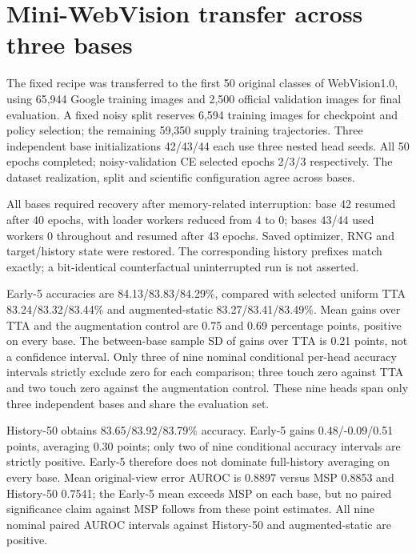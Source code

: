 \section{Mini-WebVision transfer across three bases}
\label{sec:minipilot}
The fixed recipe was transferred to the first 50 original classes of WebVision1.0,
using 65,944 Google training images and 2,500 official validation images for final
evaluation. A fixed noisy split reserves 6,594 training images for checkpoint and
policy selection; the remaining 59,350 supply training trajectories. Three
independent base initializations 42/43/44 each use three nested head seeds.
All 50 epochs completed; noisy-validation CE selected epochs 2/3/3 respectively.
The dataset realization, split and scientific configuration agree across bases.

All bases required recovery after memory-related interruption: base 42 resumed
after 40 epochs, with loader workers reduced from 4 to 0; bases 43/44 used workers 0
throughout and resumed after 43 epochs. Saved optimizer, RNG and target/history
state were restored. The corresponding history prefixes match exactly; a
bit-identical counterfactual uninterrupted run is not asserted.

\begin{table}[t]
\centering

\caption{Mini-WebVision accuracy (\%) across independent bases. Learned methods
average three nested heads per base, then bases equally. They are not ensembles.
Error AUROC is the equally weighted mean for original-view FP32 base errors.
Each method uses its own noisy-validation policy.}
\label{tab:minipilot}
\end{table}

Early-5 accuracies are 84.13/83.83/84.29\%, compared with selected uniform
TTA 83.24/83.32/83.44\% and augmented-static 83.27/83.41/83.49\%.
Mean gains over TTA and the augmentation control are 0.75 and 0.69 percentage
points, positive on every base. The between-base sample SD of gains over TTA
is 0.21 points, not a confidence interval. Only three of nine nominal conditional
per-head accuracy intervals strictly exclude zero for each comparison; three
touch zero against TTA and two touch zero against the augmentation control.
These nine heads span only three independent bases and share the evaluation set.

History-50 obtains 83.65/83.92/83.79\% accuracy. Early-5 gains 0.48/-0.09/0.51 points,
averaging 0.30 points; only two of nine conditional accuracy intervals are strictly
positive. Early-5 therefore does not dominate full-history averaging on every
base. Mean original-view error AUROC is 0.8897 versus MSP 0.8853 and History-50
0.7541; the Early-5 mean exceeds MSP on each base, but no paired significance
claim against MSP follows from these point estimates. All nine nominal paired
AUROC intervals against History-50 and augmented-static are positive.


